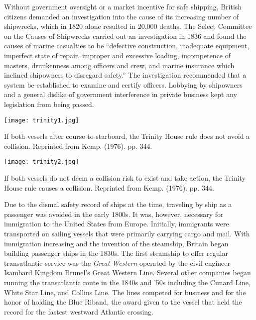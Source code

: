 \documentclass[twoside,symmetric,notoc]{tufte-book}
\begin{document}
\par{%
Without government oversight or a market incentive for safe shipping, British citizens demanded an investigation into the cause of its increasing number of shipwrecks,\cite{1838} which in 1820 alone resulted in 20,000 deaths. The Select Committee on the Causes of Shipwrecks carried out an investigation in 1836 and found the causes of marine casualties to be ``defective construction, inadequate equipment, imperfect state of repair, improper and excessive loading, incompetence of masters, drunkenness among officers and crew, and marine insurance which inclined shipowners to disregard safety.''\cite{Boisson} The investigation recommended that a system be established to examine and certify officers. Lobbying by shipowners and a general dislike of government interference in private business kept any legislation from being passed.
}
\begin{marginfigure}
	\centering
		\texttt{[image: trinity1.jpg]}
	\caption[If both vessels alter course to starboard, the Trinity House rule does not avoid a collision.]{If both vessels alter course to starboard, the Trinity House rule does not avoid a collision. Reprinted from Kemp. (1976). pp. 344.}
	\label{fig:trinity1}
\end{marginfigure}
\begin{marginfigure}
	\centering
		\texttt{[image: trinity2.jpg]}
	\caption[If both vessels do not deem a collision risk to exist and take action, the Trinity House rule causes a collision.]{If both vessels do not deem a collision risk to exist and take action, the Trinity House rule causes a collision. Reprinted from Kemp. (1976). pp. 344.}
	\label{fig:trinity2}
\end{marginfigure}
\par{%
Due to the dismal safety record of ships at the time, traveling by ship as a passenger was avoided in the early 1800s. It was, however, necessary for immigration to the United States from Europe. Initially, immigrants were transported on sailing vessels that were primarily carrying cargo and mail. With immigration increasing and the invention of the steamship, Britain began building passenger ships in the 1830s. The first steamship to offer regular transatlantic service was the \textit{Great Western} operated by the civil engineer Isambard Kingdom Brunel's Great Western Line.\cite{LeMay} Several other companies began running the transatlantic route in the 1840s and '50s including the Cunard Line, White Star Line, and Collins Line.\cite{Young} The lines competed for business and for the honor of holding the Blue Riband, the award given to the vessel that held the record for the fastest westward Atlantic crossing.\cite{Ujifua} 
}
\end{document}
